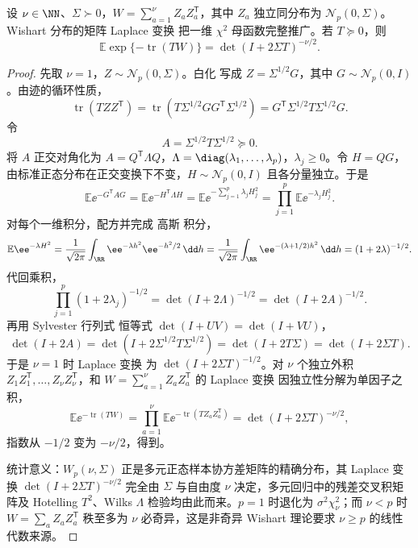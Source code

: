 \begin{proposition}
设 $\nu\in\NN$、$\Sigma\succ0$，$W=\sum_{a=1}^\nu Z_aZ_a^{\mathsf T}$，其中 $Z_a$ 独立同分布为 $\mathcal N_p(0,\Sigma)$。
Wishart 分布的矩阵 Laplace 变换 把一维 $\chi^2$ 母函数完整推广。若 $T\succeq0$，则
\begin{equation}
\mathbb E\exp\{-\operatorname{tr}(TW)\}
=
\det(I+2\Sigma T)^{-\nu/2}.
\label{eq:math-stat-wishart-laplace}
\end{equation}
\end{proposition}
\begin{proof}
先取 $\nu=1$，$Z\sim\mathcal N_p(0,\Sigma)$。白化 写成 $Z=\Sigma^{1/2}G$，其中 $G\sim\mathcal N_p(0,I)$。由迹的循环性质，
\[
\operatorname{tr}(TZZ^{\mathsf T})
=\operatorname{tr}(T\Sigma^{1/2}GG^{\mathsf T}\Sigma^{1/2})
=G^{\mathsf T}\Sigma^{1/2}T\Sigma^{1/2}G.
\]
令
\[
A=\Sigma^{1/2}T\Sigma^{1/2}\succeq0.
\]
将 $A$ 正交对角化为 $A=Q^{\mathsf T}\Lambda Q$，$\Lambda=\diag(\lambda_1,\ldots,\lambda_p)$，$\lambda_j\ge0$。令 $H=QG$，由标准正态分布在正交变换下不变，$H\sim\mathcal N_p(0,I)$ 且各分量独立。于是
\[
\mathbb E\ee^{-G^{\mathsf T}AG}
=\mathbb E\ee^{-H^{\mathsf T}\Lambda H}
=\mathbb E\ee^{-\sum_{j=1}^p\lambda_jH_j^2}
=\prod_{j=1}^p\mathbb E\ee^{-\lambda_jH_j^2}.
\]
对每个一维积分，配方并完成 高斯 积分，
\[
\mathbb E\ee^{-\lambda H^2}
=\frac1{\sqrt{2\pi}}\int_\RR\ee^{-\lambda h^2}\ee^{-h^2/2}\,\dd h
=\frac1{\sqrt{2\pi}}\int_\RR\ee^{-(\lambda+1/2)h^2}\,\dd h
=(1+2\lambda)^{-1/2}.
\]
代回乘积，
\[
\prod_{j=1}^p(1+2\lambda_j)^{-1/2}
=\det(I+2\Lambda)^{-1/2}
=\det(I+2A)^{-1/2}.
\]
再用 Sylvester 行列式 恒等式 $\det(I+UV)=\det(I+VU)$，
\[
\det(I+2A)
=\det(I+2\Sigma^{1/2}T\Sigma^{1/2})
=\det(I+2T\Sigma)
=\det(I+2\Sigma T).
\]
于是 $\nu=1$ 时 Laplace 变换 为 $\det(I+2\Sigma T)^{-1/2}$。对 $\nu$ 个独立外积 $Z_1Z_1^{\mathsf T},\ldots,Z_\nu Z_\nu^{\mathsf T}$，和 $W=\sum_{a=1}^\nu Z_aZ_a^{\mathsf T}$ 的 Laplace 变换 因独立性分解为单因子之积，
\[
\mathbb E\ee^{-\operatorname{tr}(TW)}
=\prod_{a=1}^\nu\mathbb E\ee^{-\operatorname{tr}(TZ_aZ_a^{\mathsf T})}
=\det(I+2\Sigma T)^{-\nu/2},
\]
指数从 $-1/2$ 变为 $-\nu/2$，得到。

统计意义：$W_p(\nu,\Sigma)$ 正是多元正态样本协方差矩阵的精确分布，其 Laplace 变换 $\det(I+2\Sigma T)^{-\nu/2}$ 完全由 $\Sigma$ 与自由度 $\nu$ 决定，多元回归中的残差交叉积矩阵及 Hotelling $T^2$、Wilks $\Lambda$ 检验均由此而来。$p=1$ 时退化为 $\sigma^2\chi^2_\nu$；而 $\nu<p$ 时 $W=\sum_aZ_aZ_a^{\mathsf T}$ 秩至多为 $\nu$ 必奇异，这是非奇异 Wishart 理论要求 $\nu\ge p$ 的线性代数来源。
\end{proof}

